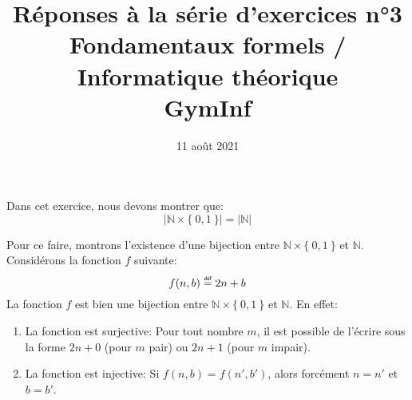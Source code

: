 \documentclass[12pt,french,a4paper]{article}
\newcommand\eqdef{\mathrel{\overset{\makebox[0pt]{\mbox{\normalfont\tiny\sffamily déf}}}{=}}}
\begin{document}
\title{\vspace{-2cm}Réponses à la série d'exercices n°3\\\large{Fondamentaux formels / Informatique théorique\\GymInf}}
\date{\vspace{-1cm}11 août 2021}

\maketitle

\begin{question}
Dans cet exercice, nous devons montrer que:
\[
|\mathbb{N} \times \{\ 0, 1\ \}| = |\mathbb{N}|
\]

Pour ce faire, montrons l'existence d'une bijection entre $\mathbb{N} \times \{\ 0, 1\ \}$ et $\mathbb{N}$.
Considérons la fonction $f$ suivante:
\[
f(n, b) \eqdef 2n + b
\]
La fonction $f$ est bien une bijection entre $\mathbb{N} \times \{\ 0, 1\ \}$ et $\mathbb{N}$. En effet:
\begin{enumerate}
\item La fonction est surjective: Pour tout nombre $m$, il est possible de l'écrire sous la forme $2n + 0$ (pour $m$ pair) ou $2n + 1$ (pour $m$ impair).
\item La fonction est injective: Si $f(n, b) = f(n', b')$, alors forcément $n = n'$ et $b = b'$.
\end{enumerate}
\end{question}
\end{document}
